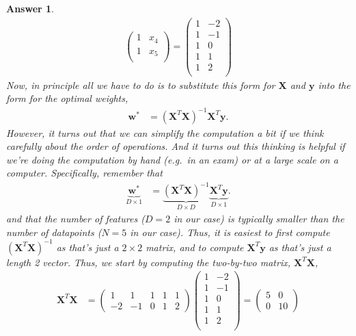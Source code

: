 \documentclass{article}
\newtheorem{answer}{Answer}
\newcommand{\bracket}[3]{\left#1 #3 \right#2}
\renewcommand{\b}{\bracket{(}{)}}
\newcommand{\y}{\mathbf{y}}
\newcommand{\X}{\mathbf{X}}
\newcommand{\w}{\mathbf{w}}
\newcommand{\wo}{\w^*}
\begin{document}
\begin{answer}
\begin{align}
\begin{pmatrix}
      1 & x_4\\
      1 & x_5\\
    \end{pmatrix}
    = \begin{pmatrix}
      1 & -2\\
      1 & -1\\
      1 & 0\\
      1 & 1\\
      1 & 2\\
    \end{pmatrix}
  \end{align}
  Now, in principle all we have to do is to substitute this form for $\X$ and $\y$ into the form for the optimal weights,
  \begin{align}
    \wo &= \b{\X^T \X}^{-1} \X^T \y.
  \end{align}
  However, it turns out that we can simplify the computation a bit if we think carefully about the order of operations.
  And it turns out this thinking is helpful if we're doing the computation by hand (e.g.\ in an exam) or at a large scale on a computer.
  Specifically, remember that 
  \begin{align}
    \underbrace{\wo}_{D \times 1} &= \underbrace{\b{\X^T \X}^{-1}}_{D \times D} \underbrace{\X^T \y}_{D \times 1}.
  \end{align}
  and that the number of features ($D=2$ in our case) is typically smaller than the number of datapoints ($N=5$ in our case).
  Thus, it is easiest to first compute $\b{\X^T \X}^{-1}$ as that's just a $2\times 2$ matrix, and to compute $\X^T \y$ as that's just a length 2 vector.
  Thus, we start by computing the two-by-two matrix, $\X^T \X$,
  \begin{align}
    \X^T \X &= 
    \begin{pmatrix}
      1 & 1 & 1 & 1 & 1\\
      -2 & -1 & 0 & 1 & 2
    \end{pmatrix}
    \begin{pmatrix}
      1 & -2\\
      1 & -1\\
      1 & 0\\
      1 & 1\\
      1 & 2\\
    \end{pmatrix}
    = \begin{pmatrix}
      5 & 0 \\ 0 & 10
    \end{pmatrix}
  \end{align}

\end{answer}
\end{document}
